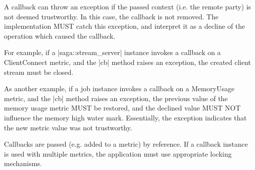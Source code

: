     A callback can throw an 
    exception if the passed context (i.e. the remote party) is
    not deemed trustworthy.  In this case, the callback is not
    removed.  The implementation MUST catch this
    exception, and interpret it as a decline of the operation
    which caused the callback.
 
    For example, if a |saga::stream_server| instance invokes a
    callback on a ClientConnect metric, and the |cb| method raises
    an  exception, the created
    client stream must be closed.
 
    As another example, if a job instance invokes a callback on
    a MemoryUsage metric, and the |cb| method raises an
     exception, the previous value
    of the memory usage metric MUST be restored, and the
    declined value MUST NOT influence the memory high water
    mark.  Essentially, the exception indicates that the new
    metric value was not trustworthy.
 
    Callbacks are passed (e.g. added to a metric) by reference.
    If a callback instance is used with multiple
    metrics, the application must use appropriate locking mechanisms.
 
